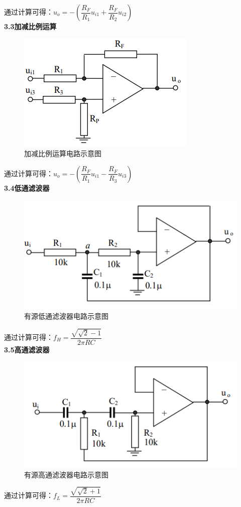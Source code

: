 \documentclass[a4 paper,12pt]{article}
\begin{document}
\par 通过计算可得：$u_{o}=-(\dfrac{R_{F}}{R_{1}}u_{i1}+\dfrac{R_{F}}{R_{2}}u_{i2})$\\
	\textbf{3.3加减比例运算}
		\begin{figure}[H]
		\centering
		\hspace{2em}\includegraphics[width=.25\linewidth]{pic/4.png}
		\caption{\small{加减比例运算电路示意图}
		}
	\end{figure}
\par 通过计算可得：$u_{o}=-(\dfrac{R_{F}}{R_{1}}u_{i1}-\dfrac{R_{F}}{R_{3}}u_{i3})$\\
	\textbf{3.4低通滤波器}
			\begin{figure}[H]
		\centering
		\hspace{2em}\includegraphics[width=.25\linewidth]{pic/5.png}
		\caption{\small{有源低通滤波器电路示意图}
		}
	\end{figure}
\par 通过计算可得：$f_{H}=\dfrac{\sqrt{\sqrt{2}-1}}{2\pi RC}$\\
	\textbf{3.5高通滤波器}
			\begin{figure}[H]
		\centering
		\hspace{2em}\includegraphics[width=.25\linewidth]{pic/6.png}
		\caption{\small{有源高通滤波器电路示意图}
		}
	\end{figure}
\par 通过计算可得：$f_{L}=\dfrac{\sqrt{\sqrt{2}+1}}{2\pi RC}$\\
\end{document}
